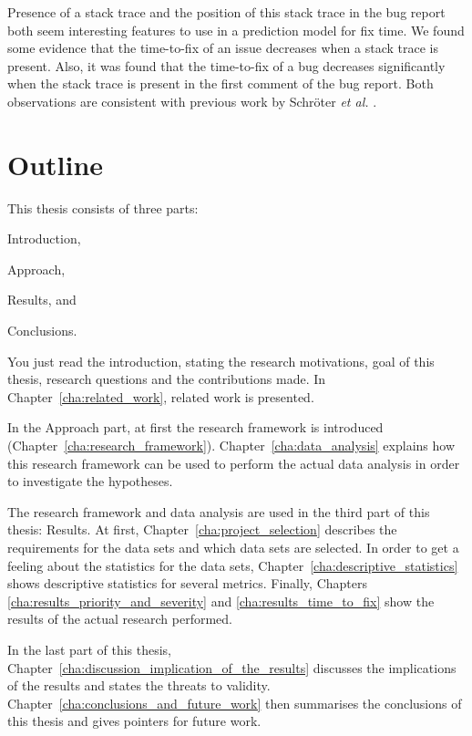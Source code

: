 Presence of a stack trace and the position of this stack trace in the bug report both seem interesting features to use in a prediction model for fix time. We found some evidence that the time-to-fix of an issue decreases when a stack trace is present. Also, it was found that the time-to-fix of a bug decreases significantly when the stack trace is present in the first comment of the bug report. Both observations are consistent with previous work by Schr\"{o}ter \emph{et al.} \cite{Schroter2010}.

\section{Outline}
This thesis consists of three parts:
\begin{inparaenum}[(I)]
\item Introduction,
\item Approach,  
\item Results, and
\item Conclusions.
\end{inparaenum}

You just read the introduction, stating the research motivations, goal of this thesis, research questions and the contributions made. In Chapter~\ref{cha:related_work}, related work is presented.

In the Approach part, at first the research framework is introduced (Chapter~\ref{cha:research_framework}). Chapter~\ref{cha:data_analysis} explains how this research framework can be used to perform the actual data analysis in order to investigate the hypotheses.

The research framework and data analysis are used in the third part of this thesis: Results. At first, Chapter~\ref{cha:project_selection} describes the requirements for the data sets and which data sets are selected. In order to get a feeling about the statistics for the data sets, Chapter~\ref{cha:descriptive_statistics} shows descriptive statistics for several metrics. Finally, Chapters \ref{cha:results_priority_and_severity} and \ref{cha:results_time_to_fix} show the results of the actual research performed.

In the last part of this thesis, Chapter~\ref{cha:discussion_implication_of_the_results} discusses the implications of the results and states the threats to validity. Chapter~\ref{cha:conclusions_and_future_work} then summarises the conclusions of this thesis and gives pointers for future work.
